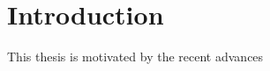 \chapter*{Introduction}
\thispagestyle{empty}

This thesis is motivated by the recent advances

\clearpage